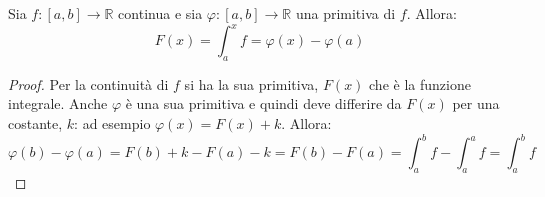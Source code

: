 \documentclass[a4paper,12pt, oneside]{book}
\begin{document}
\newpage
\begin{teorema} Sia
  $f:[a,b]\rightarrow\mathbb{R}$ continua e sia
  $\varphi:[a,b]\rightarrow\mathbb{R}$ una primitiva di $f$. Allora:
  $$F(x)=\int_a^x f=\varphi(x)-\varphi(a)$$
\end{teorema}
\begin{proof} Per la continuità di $f$ si ha la sua primitiva, $F(x)$ che è la
  funzione integrale. Anche $\varphi$ è una sua primitiva e quindi deve differire
  da $F(x)$ per una costante, $k$: ad esempio $\varphi(x)=F(x)+k$. Allora:
  $$ \varphi(b)-\varphi(a)=F(b)+k-F(a)-k=F(b)-F(a)=\int_a^b f-\int_a^af=\int_a^bf$$
\end{proof}
\end{document}

